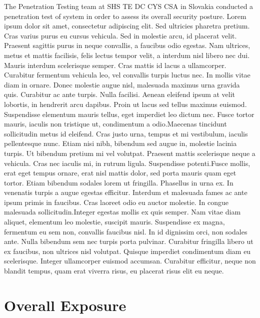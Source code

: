
The Penetration Testing team at SHS TE DC CYS CSA in Slovakia conducted a penetration test of \textbf{\textsc{\ReportProjectName}} system in order to assess its overall security posture. Lorem ipsum dolor sit amet, consectetur adipiscing elit. Sed ultricies pharetra pretium. Cras varius purus eu cursus vehicula. Sed in molestie arcu, id placerat velit. Praesent sagittis purus in neque convallis, a faucibus odio egestas. Nam ultrices, metus et mattis facilisis, felis lectus tempor velit, a interdum nisl libero nec dui. Mauris interdum scelerisque semper. Cras mattis id lacus a ullamcorper. Curabitur fermentum vehicula leo, vel convallis turpis luctus nec. In mollis vitae diam in ornare. Donec molestie augue nisl, malesuada maximus urna gravida quis. Curabitur ac ante turpis. Nulla facilisi. Aenean eleifend ipsum at velit lobortis, in hendrerit arcu dapibus. Proin ut lacus sed tellus maximus euismod. Suspendisse elementum mauris tellus, eget imperdiet leo dictum nec. Fusce tortor mauris, iaculis non tristique ut, condimentum a odio.Maecenas tincidunt sollicitudin metus id eleifend. Cras justo urna, tempus et mi vestibulum, iaculis pellentesque nunc. Etiam nisi nibh, bibendum sed augue in, molestie lacinia turpis. Ut bibendum pretium mi vel volutpat. Praesent mattis scelerisque neque a vehicula. Cras nec iaculis mi, in rutrum ligula. Suspendisse potenti.Fusce mollis, erat eget tempus ornare, erat nisl mattis dolor, sed porta mauris quam eget tortor. Etiam bibendum sodales lorem ut fringilla. Phasellus in urna ex. In venenatis turpis a augue egestas efficitur. Interdum et malesuada fames ac ante ipsum primis in faucibus. Cras laoreet odio eu auctor molestie. In congue malesuada sollicitudin.Integer egestas mollis ex quis semper. Nam vitae diam aliquet, elementum leo molestie, suscipit mauris. Suspendisse ex magna, fermentum eu sem non, convallis faucibus nisl. In id dignissim orci, non sodales ante. Nulla bibendum sem nec turpis porta pulvinar. Curabitur fringilla libero ut ex faucibus, non ultrices nisl volutpat. Quisque imperdiet condimentum diam eu scelerisque. Integer ullamcorper euismod accumsan. Curabitur efficitur, neque non blandit tempus, quam erat viverra risus, eu placerat risus elit eu neque. 

\pagebreak
\section*{Overall Exposure}